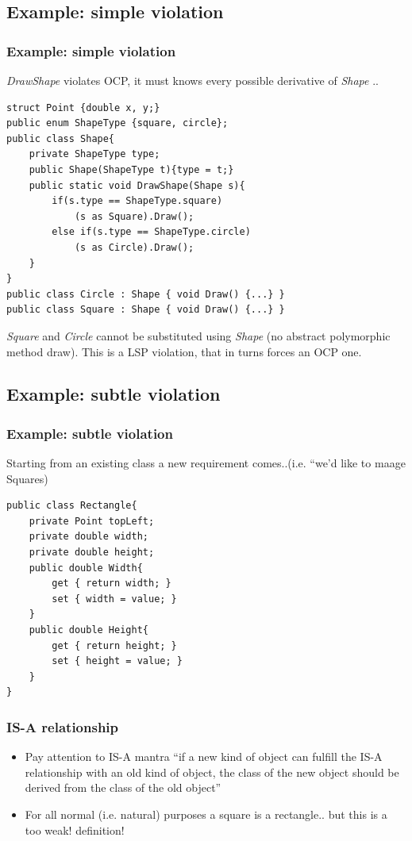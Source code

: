 \documentclass{beamer}
\begin{document}
\subsection{Example: simple violation}
\begin{frame}[containsverbatim]
	\frametitle{Example: simple violation}
	\textit{DrawShape} violates OCP, it must knows every possible derivative of \textit{Shape} .. \\
	\begin{lstlisting}
struct Point {double x, y;}
public enum ShapeType {square, circle};
public class Shape{
	private ShapeType type;
	public Shape(ShapeType t){type = t;}
	public static void DrawShape(Shape s){
		if(s.type == ShapeType.square)
			(s as Square).Draw();
		else if(s.type == ShapeType.circle)
			(s as Circle).Draw();
	}
}
public class Circle : Shape { void Draw() {...} }
public class Square : Shape { void Draw() {...} }

	\end{lstlisting}
	\textit{Square} and \textit{Circle} cannot be substituted using \textit{Shape} (no abstract polymorphic method draw). This is a LSP violation, that in turns forces an OCP one.  \\
\end{frame}


\subsection{Example: subtle violation}
\begin{frame}[containsverbatim]
	\frametitle{Example: subtle violation}
	Starting from an existing class a new requirement comes..(i.e. ``we'd like to maage Squares) \\
	\begin{lstlisting}
public class Rectangle{
	private Point topLeft;
	private double width;
	private double height;
	public double Width{
		get { return width; }
		set { width = value; }
	}
	public double Height{
		get { return height; }
		set { height = value; }
	}
}
	\end{lstlisting}
\end{frame}

\begin{frame}
  \frametitle{IS-A relationship}
  \begin{itemize}
	\item<+-> Pay attention to IS-A mantra ``if a new kind of object can fulfill the IS-A relationship with an old kind of object, the class of the new object should be derived from the class of the old object''
	\item<+-> For all normal (i.e. natural) purposes a square is a rectangle.. but this is a too weak! definition!
   \end{itemize}
\end{frame}
\end{document}

